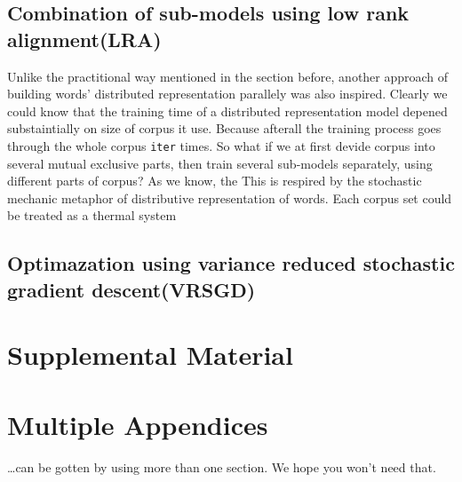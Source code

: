 \documentclass[11pt]{article}
\begin{document}
\subsection{Combination of sub-models using low rank alignment(LRA)}
Unlike the practitional way mentioned in the section before, another approach of building words' distributed representation parallely was also inspired. Clearly we could know that the training time of a distributed representation model depened substaintially on size of corpus it use. Because afterall the training process goes through the whole corpus \verb|iter| times. So what if we at first devide corpus into several mutual exclusive parts, then train several sub-models separately, using different parts of corpus? As we know, the This is respired by the stochastic mechanic metaphor of distributive representation of words. Each corpus set could be treated as a thermal system 
\subsection{Optimazation using variance reduced stochastic gradient descent(VRSGD)}




\appendix

\section{Supplemental Material}
\label{sec:supplemental}

\section{Multiple Appendices}
\dots can be gotten by using more than one section. We hope you won't
need that.
\end{document}
